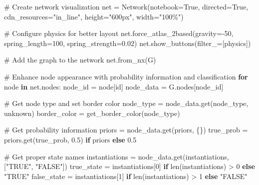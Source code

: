 \documentclass[
  11pt,
  letterpaper,
]{book}
\newenvironment{Shaded}{\begin{snugshade}}{\end{snugshade}}
\newcommand{\BuiltInTok}[1]{\textcolor[rgb]{0.00,0.23,0.31}{#1}}
\newcommand{\CommentTok}[1]{\textcolor[rgb]{0.37,0.37,0.37}{#1}}
\newcommand{\ControlFlowTok}[1]{\textcolor[rgb]{0.00,0.23,0.31}{\textbf{#1}}}
\newcommand{\DecValTok}[1]{\textcolor[rgb]{0.68,0.00,0.00}{#1}}
\newcommand{\FloatTok}[1]{\textcolor[rgb]{0.68,0.00,0.00}{#1}}
\newcommand{\KeywordTok}[1]{\textcolor[rgb]{0.00,0.23,0.31}{\textbf{#1}}}
\newcommand{\NormalTok}[1]{\textcolor[rgb]{0.00,0.23,0.31}{#1}}
\newcommand{\OperatorTok}[1]{\textcolor[rgb]{0.37,0.37,0.37}{#1}}
\newcommand{\StringTok}[1]{\textcolor[rgb]{0.13,0.47,0.30}{#1}}
\newcommand{\VariableTok}[1]{\textcolor[rgb]{0.07,0.07,0.07}{#1}}
\begin{document}
\begin{Shaded}
\begin{Highlighting}[]
    \CommentTok{\# Create network visualization}
\NormalTok{    net }\OperatorTok{=}\NormalTok{ Network(notebook}\OperatorTok{=}\VariableTok{True}\NormalTok{, directed}\OperatorTok{=}\VariableTok{True}\NormalTok{, cdn\_resources}\OperatorTok{=}\StringTok{"in\_line"}\NormalTok{, height}\OperatorTok{=}\StringTok{"600px"}\NormalTok{, width}\OperatorTok{=}\StringTok{"100\%"}\NormalTok{)}

    \CommentTok{\# Configure physics for better layout}
\NormalTok{    net.force\_atlas\_2based(gravity}\OperatorTok{={-}}\DecValTok{50}\NormalTok{, spring\_length}\OperatorTok{=}\DecValTok{100}\NormalTok{, spring\_strength}\OperatorTok{=}\FloatTok{0.02}\NormalTok{)}
\NormalTok{    net.show\_buttons(filter\_}\OperatorTok{=}\NormalTok{[}\StringTok{\textquotesingle{}physics\textquotesingle{}}\NormalTok{])}

    \CommentTok{\# Add the graph to the network}
\NormalTok{    net.from\_nx(G)}

    \CommentTok{\# Enhance node appearance with probability information and classification}
    \ControlFlowTok{for}\NormalTok{ node }\KeywordTok{in}\NormalTok{ net.nodes:}
\NormalTok{        node\_id }\OperatorTok{=}\NormalTok{ node[}\StringTok{\textquotesingle{}id\textquotesingle{}}\NormalTok{]}
\NormalTok{        node\_data }\OperatorTok{=}\NormalTok{ G.nodes[node\_id]}

        \CommentTok{\# Get node type and set border color}
\NormalTok{        node\_type }\OperatorTok{=}\NormalTok{ node\_data.get(}\StringTok{\textquotesingle{}node\_type\textquotesingle{}}\NormalTok{, }\StringTok{\textquotesingle{}unknown\textquotesingle{}}\NormalTok{)}
\NormalTok{        border\_color }\OperatorTok{=}\NormalTok{ get\_border\_color(node\_type)}

        \CommentTok{\# Get probability information}
\NormalTok{        priors }\OperatorTok{=}\NormalTok{ node\_data.get(}\StringTok{\textquotesingle{}priors\textquotesingle{}}\NormalTok{, \{\})}
\NormalTok{        true\_prob }\OperatorTok{=}\NormalTok{ priors.get(}\StringTok{\textquotesingle{}true\_prob\textquotesingle{}}\NormalTok{, }\FloatTok{0.5}\NormalTok{) }\ControlFlowTok{if}\NormalTok{ priors }\ControlFlowTok{else} \FloatTok{0.5}

        \CommentTok{\# Get proper state names}
\NormalTok{        instantiations }\OperatorTok{=}\NormalTok{ node\_data.get(}\StringTok{\textquotesingle{}instantiations\textquotesingle{}}\NormalTok{, [}\StringTok{"TRUE"}\NormalTok{, }\StringTok{"FALSE"}\NormalTok{])}
\NormalTok{        true\_state }\OperatorTok{=}\NormalTok{ instantiations[}\DecValTok{0}\NormalTok{] }\ControlFlowTok{if} \BuiltInTok{len}\NormalTok{(instantiations) }\OperatorTok{\textgreater{}} \DecValTok{0} \ControlFlowTok{else} \StringTok{"TRUE"}
\NormalTok{        false\_state }\OperatorTok{=}\NormalTok{ instantiations[}\DecValTok{1}\NormalTok{] }\ControlFlowTok{if} \BuiltInTok{len}\NormalTok{(instantiations) }\OperatorTok{\textgreater{}} \DecValTok{1} \ControlFlowTok{else} \StringTok{"FALSE"}


\end{Highlighting}
\end{Shaded}
\end{document}

